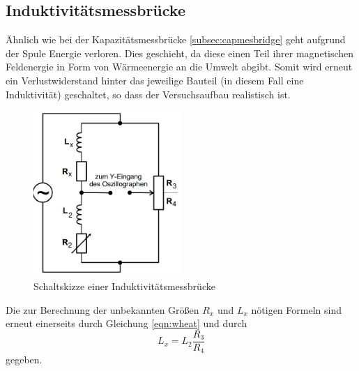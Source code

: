 \subsection{Induktivitätsmessbrücke} \label{subsec:inductance}
Ähnlich wie bei der Kapazitätsmessbrücke \ref{subsec:capmesbridge} geht aufgrund der Spule Energie verloren.
Dies geschieht, da diese einen Teil ihrer magnetischen Feldenergie in Form von Wärmeenergie an die Umwelt abgibt. Somit wird erneut ein Verlustwiderstand 
hinter das jeweilige Bauteil (in diesem Fall eine Induktivität) geschaltet, so dass der Versuchsaufbau realistisch ist.
\begin{figure}
    \centering
    \caption{Schaltskizze einer Induktivitätsmessbrücke}
    \label{fig:inductance}
    \includegraphics[width=0.5\textwidth]{bridges/inductance.png}
\end{figure}
Die zur Berechnung der unbekannten Größen $R_x$ und $L_x$ nötigen Formeln sind erneut einerseits durch Gleichung \eqref{eqn:wheat}
und durch
\begin{equation}
    L_x = L_2 \frac{R_3}{R_4} \label{eqn:inducmes}
\end{equation}
gegeben.
